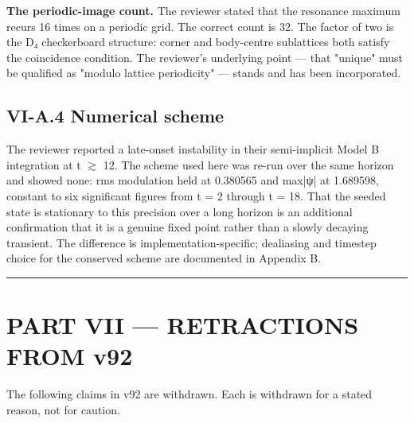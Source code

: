 \documentclass[a4paper,11pt]{article}
\begin{document}
\textbf{The periodic-image count.} The reviewer stated that the resonance maximum recurs 16 times on a periodic grid. The correct count is 32. The factor of two is the D₄ checkerboard structure: corner and body-centre sublattices both satisfy the coincidence condition. The reviewer's underlying point — that "unique" must be qualified as "modulo lattice periodicity" — stands and has been incorporated.

\subsection*{VI-A.4 Numerical scheme}

The reviewer reported a late-onset instability in their semi-implicit Model B integration at t $\gtrsim$ 12. The scheme used here was re-run over the same horizon and showed none: rms modulation held at 0.380565 and max|ψ| at 1.689598, constant to six significant figures from t = 2 through t = 18. That the seeded state is stationary to this precision over a long horizon is an additional confirmation that it is a genuine fixed point rather than a slowly decaying transient. The difference is implementation-specific; dealiasing and timestep choice for the conserved scheme are documented in Appendix B.

\medskip\hrule\medskip

\section*{PART VII — RETRACTIONS FROM v92}

The following claims in v92 are withdrawn. Each is withdrawn for a stated reason, not for caution.
\end{document}

